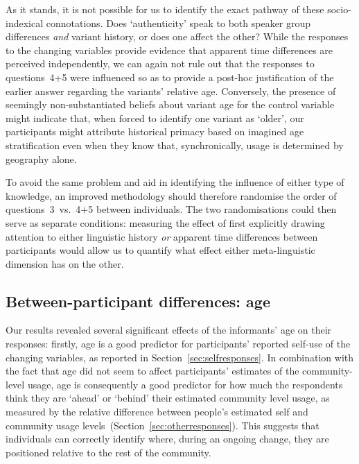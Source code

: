 As it stands, it is not possible for us to identify the exact pathway of these socio-indexical connotations. Does `authenticity' speak to both speaker group differences \emph{and} variant history, or does one affect the other?
While the responses to the changing variables provide evidence that apparent time differences are perceived independently, we can again not rule out that the responses to questions~4+5 were influenced so as to provide a post-hoc justification of the earlier answer regarding the variants' relative age. Conversely, the presence of seemingly non-substantiated beliefs about variant age for the control variable might indicate that, when forced to identify one variant as `older', our participants might attribute historical primacy based on imagined age stratification even when they know that, synchronically, usage is determined by geography alone.

To avoid the same problem and aid in identifying the influence of either type of knowledge, an improved methodology should therefore randomise the order of questions~3~vs.~4+5 between individuals.%
The two randomisations could then serve as separate conditions:
measuring the effect of first explicitly drawing attention to either linguistic history \emph{or} apparent time differences between participants would allow us to quantify what effect either meta-linguistic dimension has on the other.






\subsection{Between-participant differences: age}

Our results revealed several significant effects of the informants' age on their responses: firstly, age is a good predictor for participants' reported self-use of the changing variables, as reported in Section~\ref{sec:selfresponses}. In combination with the fact that age did not seem to affect participants' estimates of the community-level usage,
age is consequently a good predictor for how much the respondents think they are `ahead' or `behind' their estimated community level usage, as measured by the relative difference between people's estimated self and community usage levels~(Section~\ref{sec:otherresponses}). This suggests that individuals can correctly identify where, during an ongoing change, they are positioned relative to the rest of the community.


